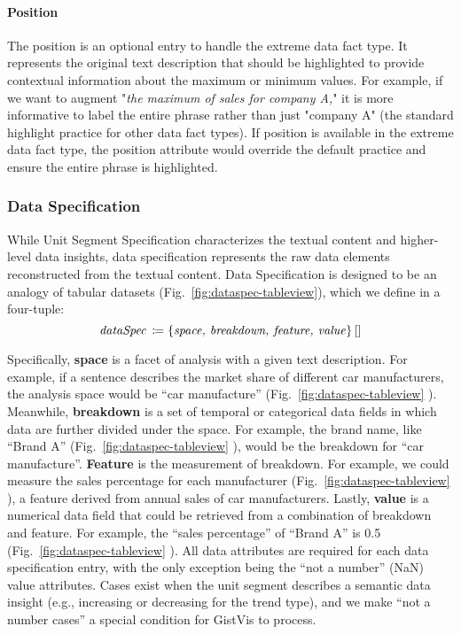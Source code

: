 \paragraph{Position}
The position is an optional entry to handle the extreme data fact type. It represents the original text description that should be highlighted to provide contextual information about the maximum or minimum values. For example, if we want to augment "\textit{the maximum of sales for company A,}" it is more informative to label the entire phrase rather than just "company A" (the standard highlight practice for other data fact types). If position is available in the extreme data fact type, the position attribute would override the default practice and ensure the entire phrase is highlighted.

\subsubsection{Data Specification}
\label{sec:gistvis-dataspec}
While Unit Segment Specification characterizes the textual content and higher-level data insights, data specification represents the raw data elements reconstructed from the textual content. Data Specification is designed to be an analogy of tabular datasets (Fig.~\ref{fig:dataspec-tableview}), which we define in a four-tuple:
\begin{equation}
    \text{\textit{dataSpec}}\, \coloneq \left \{ 
        \text{\textit{space, breakdown, feature, value}}
    \right \}[] \nonumber
\end{equation}

Specifically, \textbf{space} is a facet of analysis with a given text description. For example, if a sentence describes the market share of different car manufacturers, the analysis space would be ``car manufacture'' (Fig.~\ref{fig:dataspec-tableview} ). Meanwhile, \textbf{breakdown} is a set of temporal or categorical data fields in which data are further divided under the space. For example, the brand name, like ``Brand A'' (Fig.~\ref{fig:dataspec-tableview} ), would be the breakdown for ``car manufacture''. \textbf{Feature} is the measurement of breakdown. For example, we could measure the sales percentage for each manufacturer (Fig.~\ref{fig:dataspec-tableview} ), a feature derived from annual sales of car manufacturers. Lastly, \textbf{value} is a numerical data field that could be retrieved from a combination of breakdown and feature. For example, the ``sales percentage'' of ``Brand A'' is 0.5 (Fig.~\ref{fig:dataspec-tableview} ). All data attributes are required for each data specification entry, with the only exception being the ``not a number'' (NaN) value attributes. Cases exist when the unit segment describes a semantic data insight (e.g., increasing or decreasing for the trend type), and we make ``not a number cases'' a special condition for GistVis to process.

